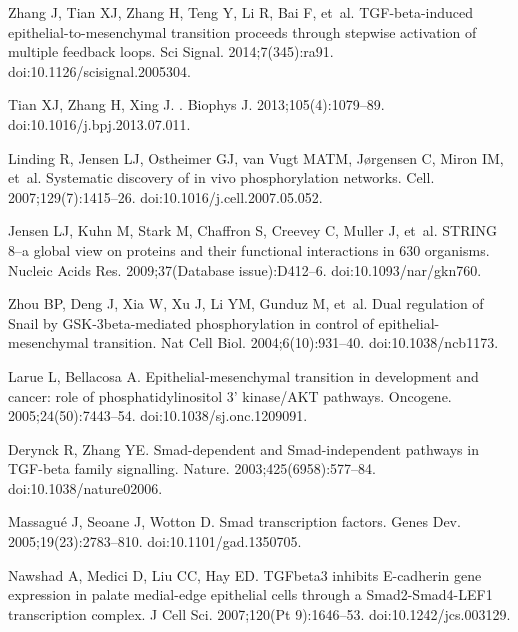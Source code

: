 \documentclass[11pt,letterpaper]{article}
\begin{document}
\begin{thebibliography}{10}
Zhang J, Tian XJ, Zhang H, Teng Y, Li R, Bai F, et~al.
\newblock TGF-beta-induced epithelial-to-mesenchymal transition proceeds
  through stepwise activation of multiple feedback loops.
\newblock Sci Signal. 2014;7(345):ra91.
\newblock doi:{10.1126/scisignal.2005304}.

Tian XJ, Zhang H, Xing J.
.
\newblock Biophys J. 2013;105(4):1079--89.
\newblock doi:{10.1016/j.bpj.2013.07.011}.

Linding R, Jensen LJ, Ostheimer GJ, van Vugt MATM, J{\o}rgensen C, Miron IM,
  et~al.
\newblock Systematic discovery of in vivo phosphorylation networks.
\newblock Cell. 2007;129(7):1415--26.
\newblock doi:{10.1016/j.cell.2007.05.052}.

Jensen LJ, Kuhn M, Stark M, Chaffron S, Creevey C, Muller J, et~al.
\newblock STRING 8--a global view on proteins and their functional interactions
  in 630 organisms.
\newblock Nucleic Acids Res. 2009;37(Database issue):D412--6.
\newblock doi:{10.1093/nar/gkn760}.

Zhou BP, Deng J, Xia W, Xu J, Li YM, Gunduz M, et~al.
\newblock Dual regulation of Snail by GSK-3beta-mediated phosphorylation in
  control of epithelial-mesenchymal transition.
\newblock Nat Cell Biol. 2004;6(10):931--40.
\newblock doi:{10.1038/ncb1173}.

Larue L, Bellacosa A.
\newblock Epithelial-mesenchymal transition in development and cancer: role of
  phosphatidylinositol 3' kinase/AKT pathways.
\newblock Oncogene. 2005;24(50):7443--54.
\newblock doi:{10.1038/sj.onc.1209091}.

Derynck R, Zhang YE.
\newblock Smad-dependent and Smad-independent pathways in TGF-beta family
  signalling.
\newblock Nature. 2003;425(6958):577--84.
\newblock doi:{10.1038/nature02006}.

Massagu{\'e} J, Seoane J, Wotton D.
\newblock Smad transcription factors.
\newblock Genes Dev. 2005;19(23):2783--810.
\newblock doi:{10.1101/gad.1350705}.

Nawshad A, Medici D, Liu CC, Hay ED.
\newblock TGFbeta3 inhibits E-cadherin gene expression in palate medial-edge
  epithelial cells through a Smad2-Smad4-LEF1 transcription complex.
\newblock J Cell Sci. 2007;120(Pt 9):1646--53.
\newblock doi:{10.1242/jcs.003129}.


\end{thebibliography}
\end{document}

